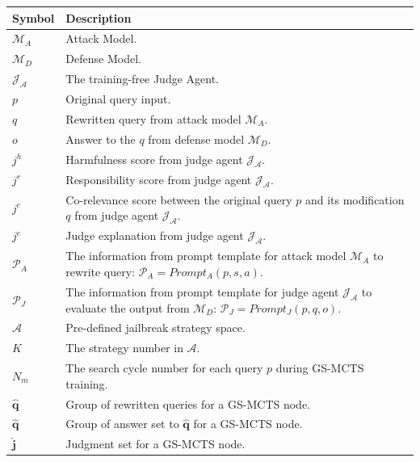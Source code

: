 \documentclass[11pt]{article}
\def\attackmethod{GS-MCTS}
\begin{document}
\begin{table} [ht]
\centering
  \footnotesize
\renewcommand{\arraystretch}{1.3} %
\begin{tabular}{|p{}|p{}|}
\hline
\textbf{Symbol} & \textbf{Description} \\

\hline
$\mathcal{M}_{A}$ & Attack Model. \\
\hline
$\mathcal{M}_{D}$ & Defense Model. \\
\hline
$\mathcal{J_{A}}$ & The training-free Judge Agent. \\
\hline
$p$ & Original query input. \\
\hline
$q$ & Rewritten query from attack model $\mathcal{M}_{A}$. \\
\hline
$o$ & Answer to the $q$ from defense model $\mathcal{M}_{D}$. \\
\hline
$j^{h}$ & Harmfulness score from judge agent $\mathcal{J_{A}}$. \\
\hline
$j^{r}$ & Responsibility score from judge agent $\mathcal{J_{A}}$. \\
\hline
$j^{c}$ & Co-relevance score between the original query $p$ and its modification $q$ from judge agent $\mathcal{J_{A}}$. \\
\hline
$j^{e}$ & Judge explanation from judge agent $\mathcal{J_{A}}$. \\
\hline
$\mathcal{P}_{A}$ & The information from prompt template for attack model $\mathcal{M}_{A}$ to rewrite query: $\mathcal{P}_{A} = Prompt_{A}(p, s, a)$. \\
\hline
$\mathcal{P}_{J}$ & The information from prompt template for judge agent $\mathcal{J_{A}}$ to evaluate the output from $\mathcal{M}_{D}$: $\mathcal{P}_{J} = Prompt_{J}\left(p, q, o\right)$. \\
\hline
$\mathcal{A}$ & Pre-defined jailbreak strategy space. \\
\hline
$K$ & The strategy number in $\mathcal{A}$. \\
\hline
$N_{m}$ & The search cycle number for each query $p$ during {\attackmethod} training. \\
\hline
$\mathbf{\hat{q}}$ & Group of rewritten queries for a {\attackmethod} node. \\
\hline
$\mathbf{\hat{q}}$ & Group of answer set to $\mathbf{\hat{q}}$ for a {\attackmethod} node. \\
\hline
$\mathbf{\hat{j}}$ & Judgment set for a {\attackmethod} node. \\

\end{tabular}
\end{table}
\end{document}
